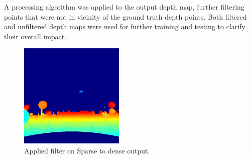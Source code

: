 \documentclass[twoside]{ctuthesis}
\theoremstyle{plain}
\theoremstyle{definition}
\theoremstyle{note}
\begin{document}
A processing algorithm was applied to the output depth map, further filtering points that were not in vicinity of the ground truth depth points. Both filtered and unfiltered depth maps were used for further training and testing to clarify their overall impact.
\begin{figure}[h!]
	\centering
	\includegraphics[width=5cm]{sparse2dense_filter.png}
	\caption{Applied filter on Sparse to dense output.}
\end{figure}
\end{document}
